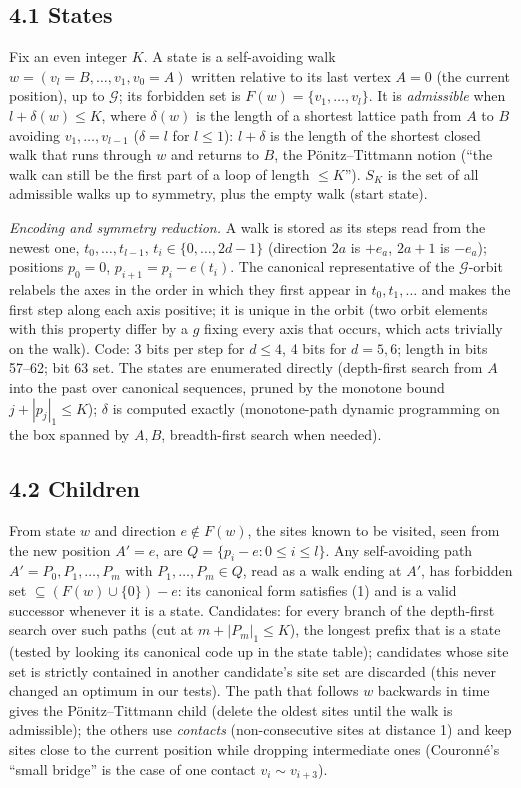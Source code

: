\documentclass[11pt,a4paper]{report}
\begin{document}
\subsection{4.1 States}

Fix an even integer \(K\). A state is a self-avoiding walk \(w=(v_l=B,\dots,v_1,v_0=A)\) written relative to its
last vertex \(A=0\) (the current position), up to \(\mathcal G\); its forbidden set is
\(F(w)=\{v_1,\dots,v_l\}\). It is \emph{admissible} when \(l+\delta(w)\le K\), where \(\delta(w)\) is the length of a
shortest lattice path from \(A\) to \(B\) avoiding \(v_1,\dots,v_{l-1}\) (\(\delta=l\) for \(l\le1\)): \(l+\delta\)
is the length of the shortest closed walk that runs through \(w\) and returns to \(B\), the Pönitz--Tittmann notion
(``the walk can still be the first part of a loop of length \(\le K\)''). \(S_K\) is the set of all admissible walks
up to symmetry, plus the empty walk (start state).

\emph{Encoding and symmetry reduction.} A walk is stored as its steps read from the newest one, \(t_0,\dots,t_{l-1}\),
\(t_i\in\{0,\dots,2d-1\}\) (direction \(2a\) is \(+e_a\), \(2a+1\) is \(-e_a\)); positions \(p_0=0\),
\(p_{i+1}=p_i-e(t_i)\). The canonical representative of the \(\mathcal G\)-orbit relabels the axes in the order in
which they first appear in \(t_0,t_1,\dots\) and makes the first step along each axis positive; it is unique in the
orbit (two orbit elements with this property differ by a \(g\) fixing every axis that occurs, which acts trivially
on the walk). Code: 3 bits per step for \(d\le4\), 4 bits for \(d=5,6\); length in bits 57--62; bit 63 set. The states
are enumerated directly (depth-first search from \(A\) into the past over canonical sequences, pruned by the monotone
bound \(j+|p_j|_1\le K\)); \(\delta\) is computed exactly (monotone-path dynamic programming on the box spanned by
\(A,B\), breadth-first search when needed).

\subsection{4.2 Children}

From state \(w\) and direction \(e\notin F(w)\), the sites known to be visited, seen from the new position \(A'=e\),
are \(Q=\{p_i-e:0\le i\le l\}\). Any self-avoiding path \(A'=P_0,P_1,\dots,P_m\) with \(P_1,\dots,P_m\in Q\), read as a
walk ending at \(A'\), has forbidden set \(\subseteq(F(w)\cup\{0\})-e\): its canonical form satisfies (1) and is a
valid successor whenever it is a state. Candidates: for every branch of the depth-first search over such paths
(cut at \(m+|P_m|_1\le K\)), the longest prefix that is a state (tested by looking its canonical code up in the state
table); candidates whose site set is strictly contained in another candidate's site set are discarded (this never
changed an optimum in our tests). The path that follows \(w\) backwards in time gives the Pönitz--Tittmann child
(delete the oldest sites until the walk is admissible); the others use \emph{contacts} (non-consecutive sites at
distance 1) and keep sites close to the current position while dropping intermediate ones (Couronné's ``small
bridge'' is the case of one contact \(v_i\sim v_{i+3}\)).
\end{document}
